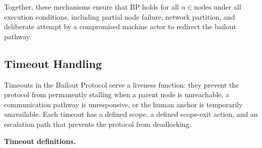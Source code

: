 Together, these mechanisms ensure that BP holds for all $n \in \text{nodes}$ under all execution conditions, including partial node failure, network partition, and deliberate attempt by a compromised machine actor to redirect the bailout pathway.

\subsection{Timeout Handling}\label{sec:timeout-handling}

Timeouts in the Bailout Protocol serve a liveness function: they prevent the protocol from permanently stalling when a parent node is unreachable, a communication pathway is unresponsive, or the human anchor is temporarily unavailable. Each timeout has a defined scope, a defined scope-exit action, and an escalation path that prevents the protocol from deadlocking.

\medskip\noindent\textbf{Timeout definitions.}

